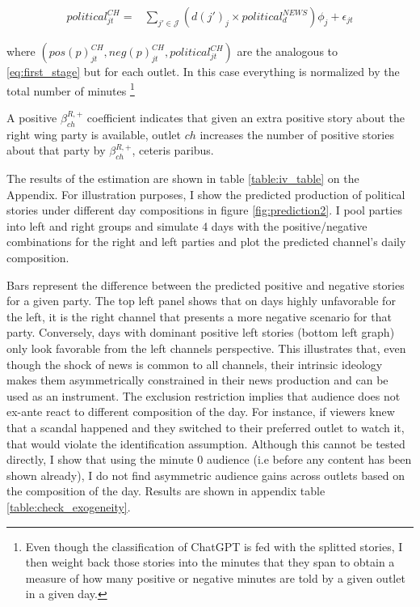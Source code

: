 \documentclass[12pt]{article}
\begin{document}
	
	
	\begin{equation}\label{eq:pred_neg}
		\begin{aligned}
			political^{CH}_{jt}=&  \sum_{j'\in \mathcal{J} }\left(d(j')_j \times political^{NEWS} _d      \right)\phi_j +\epsilon_{jt}
		\end{aligned}
	\end{equation} 
	
	
	where $(pos(p)^{CH}_{jt},neg(p)^{CH}_{jt},political^{CH}_{jt} )$  are the analogous to \ref{eq:first_stage} but for each outlet. In this case everything is normalized by the total number of minutes \footnote{Even though the classification of ChatGPT is fed with the splitted stories, I then weight back those stories into the minutes that they span to obtain a measure of how many positive or negative minutes are told by a given outlet in a given day. } 
	
	A positive $ \beta_{ch}^{R,+} $ coefficient indicates that given an extra positive story about the right wing party is available, outlet $ ch $ increases the number of positive stories about that party by $  \beta_{ch}^{R,+}  $, ceteris paribus. 
	
	
	The results of the estimation are shown in table \ref{table:iv_table} on the Appendix. For illustration purposes, I show the predicted production of political stories under different day compositions in figure \ref{fig:prediction2}. I pool parties into left and right groups and  simulate 4 days with the positive/negative combinations for the right and left parties and plot the predicted channel's daily composition. 
	
	Bars represent the difference between the predicted positive and negative  stories for a given party. The top left panel shows that on days highly unfavorable for the left, it is the right channel that presents a more negative scenario for that party. Conversely, days with dominant positive left stories (bottom left graph) only look favorable from the left channels perspective. This illustrates that, even though the shock of news is common to all channels, their intrinsic ideology makes them asymmetrically constrained in their news production and can be used as an instrument. The exclusion restriction implies that audience does not ex-ante react to different composition of the day. For instance, if viewers knew that a scandal happened and they switched to their preferred outlet to watch it, that would violate the identification assumption. Although this cannot be tested directly, I show that using the minute 0 audience (i.e before any content has been shown already), I do not find asymmetric audience gains across outlets based on the composition of the day. Results are shown in appendix table \ref{table:check_exogeneity}.
	
\end{document}
